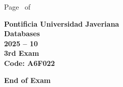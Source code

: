 \documentclass[11pt, addpoints, answers]{exam}\usepackage[utf8]{inputenc}
\begin{document}
\begin{coverpages}
\begin{center}
			\vspace{3mm}
			\leavevmode \hspace{5mm} 
		\end{center}
	\end{coverpages}

	\footer{} {Page \thepage\ of \numpages} {}

	\centering
	\textbf{\Large Pontificia Universidad Javeriana}\\
	\textbf{\Large Databases} \\
	\textbf{\large 2025 -- 10} \\
	\textbf{\large 3rd Exam} \\
	\textbf{Code: A6F022}


	\begin{questions}
		
		
		
		
		
		
		
		
		
		
		
		
		
		
		
		
		
		
		
		
	\end{questions}

	\vspace{5mm}
	\noindent \textbf{End of Exam}
\end{document}
